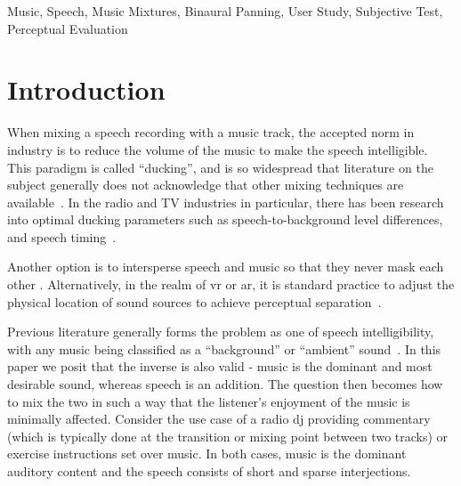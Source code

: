 \documentclass[fleqn]{jaes}
\begin{document}
\maketitle

\begin{keywords}
Music, Speech, Music Mixtures, Binaural Panning, User Study, Subjective Test, Perceptual Evaluation
\end{keywords}

\section{Introduction}
\label{sec:intro}
When mixing a speech recording with a music track, the accepted norm in industry is to reduce the volume of the music to make the speech intelligible. This paradigm is called \enquote{ducking}, and is so widespread that literature on the subject generally does not acknowledge that other mixing techniques are available~\cite{torcoliPreferredLevelsBackground2019,torcoliBackgroundDuckingProduce2019,venkateshArtificiallySynthesisingData2021,hagedornAudiobearbeitungMitAudacity2015}. In the radio and TV industries in particular, there has been research into optimal ducking parameters such as speech-to-background level differences, and speech timing~\cite{torcoliPreferredLevelsBackground2019}. 

Another option is to intersperse speech and music so that they never mask each other \cite{SpotifyDebutsNew2023}. Alternatively, in the realm of \gls{vr} or \gls{ar}, it is standard practice to adjust the physical location of sound sources to achieve perceptual separation~\cite{lugasiSpeechEnhancementUsing2020,hsuModelMatchingPrincipleApplied2023}.

Previous literature generally forms the problem as one of speech intelligibility, with any music being classified as a \enquote{background} or \enquote{ambient} sound~\cite{torcoliPreferredLevelsBackground2019,hsuModelMatchingPrincipleApplied2023,hakeIndividualDifferencesAuditory2025}. In this paper we posit that the inverse is also valid - music is the dominant and most desirable sound, whereas speech is an addition. The question then becomes how to mix the two in such a way that the listener's enjoyment of the music is minimally affected. Consider the use case of a radio \gls{dj} providing commentary (which is typically done at the transition or mixing point between two tracks) or exercise instructions set over music. In both cases, music is the dominant auditory content and the speech consists of short and sparse interjections. 
\end{document}
